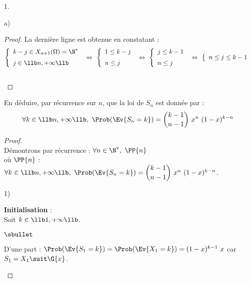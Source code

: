 \documentclass[11pt]{article}%
\begin{document}
\begin{noliste}{1.}
\begin{noliste}{a)}
\begin{proof}
      \noindent
      La dernière ligne est obtenue en constatant :
      \[
      \left\{
        \begin{array}{l}
          k-j \in X_{n+1}(\Omega) = \N^* \\[.2cm]
          j \in \llb n, +\infty \llb
        \end{array}
      \right.
      \ \Leftrightarrow \
      \left\{
        \begin{array}{l}
          1 \leq k-j \\[.2cm]
          n \leq j
        \end{array}
      \right.
      \ \Leftrightarrow \
      \left\{
        \begin{array}{l}
          j \leq k-1 \\[.2cm]
          n \leq j
        \end{array}
      \right.
      \ \Leftrightarrow \
      \left\{
        \begin{array}{l}
          n \leq j \leq k-1
        \end{array}
      \right.
      \]
      ~\\[-1.4cm]
    \end{proof}

  \item En déduire, par récurrence sur $n$, que la loi de $S_n$ est
    donnée par :
    \[
    \forall k \in \llb n, + \infty \llb, \ \Prob(\Ev{S_n = k}) =
    \dbinom{k-1}{n-1} \ x^n \ (1-x)^{k-n}
    \]

    \begin{proof}~\\
      Démontrons par récurrence : $\forall n \in \N^*, \ \PP{n}$\\[.2cm]
      où $\PP{n}$ : $\forall k \in \llb n, +\infty \llb, \
      \Prob(\Ev{S_{n} = k}) = \dbinom{k-1}{n-1} \ x^{n} \
      (1-x)^{k-n}$.
      \begin{noliste}{1)}
      \item {\bf Initialisation} :\\
        Soit $k \in \llb 1, +\infty \llb$.
        \begin{noliste}{$\sbullet$}
        \item D'une part : $\Prob(\Ev{S_{1} = k}) = \Prob(\Ev{X_{1} =
            k}) = (1-x)^{k-1} \ x$ car $S_1 = X_1 \suit \G{x}$.


\end{noliste}
\end{noliste}
\end{proof}
\end{noliste}
\end{noliste}
\end{document}
